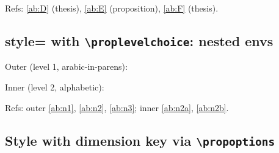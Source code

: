 \documentclass{article}
\begin{document}

Refs: \ref{ab:D} (thesis), \ref{ab:E} (proposition), \ref{ab:F} (thesis).

\subsection{style= with \texttt{\textbackslash proplevelchoice}: nested envs}



Outer (level 1, arabic-in-parens):
\begin{prop}
  \item \label{ab:n1}
  \item \label{ab:n2}

  Inner (level 2, alphabetic):
  \begin{prop}
    \item \label{ab:n2a}
    \item \label{ab:n2b}
  \end{prop}

  \item \label{ab:n3}
\end{prop}


Refs: outer \ref{ab:n1}, \ref{ab:n2}, \ref{ab:n3}; inner \ref{ab:n2a}, \ref{ab:n2b}.

\subsection{Style with dimension key via \texttt{\textbackslash propoptions}}


\end{document}

